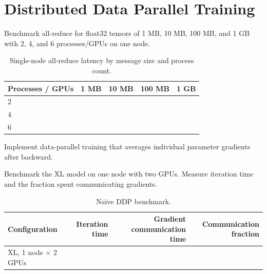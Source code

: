 \section{Distributed Data Parallel Training}
\label{sec:distributed-training}


Benchmark all-reduce for float32 tensors of 1 MB, 10 MB, 100 MB, and 1 GB with 2, 4, and 6 processes/GPUs on one node.

\begin{table}[htbp]
\centering\small
\begin{tabular}{@{}lrrrr@{}}
\toprule
Processes / GPUs & 1 MB & 10 MB & 100 MB & 1 GB \\
\midrule
2 & & & & \\
4 & & & & \\
6 & & & & \\
\bottomrule
\end{tabular}
\caption{Single-node all-reduce latency by message size and process count.}
\label{tab:all-reduce}
\end{table}
\answer


Implement data-parallel training that averages individual parameter gradients after backward.

\answer


Benchmark the XL model on one node with two GPUs. Measure iteration time and the fraction spent communicating gradients.

\begin{table}[htbp]
\centering\small
\begin{tabular}{@{}lrrr@{}}
\toprule
Configuration & Iteration time & Gradient communication time & Communication fraction \\
\midrule
XL, 1 node $\times$ 2 GPUs & & & \\
\bottomrule
\end{tabular}
\caption{Naïve DDP benchmark.}
\label{tab:naive-ddp}
\end{table}

